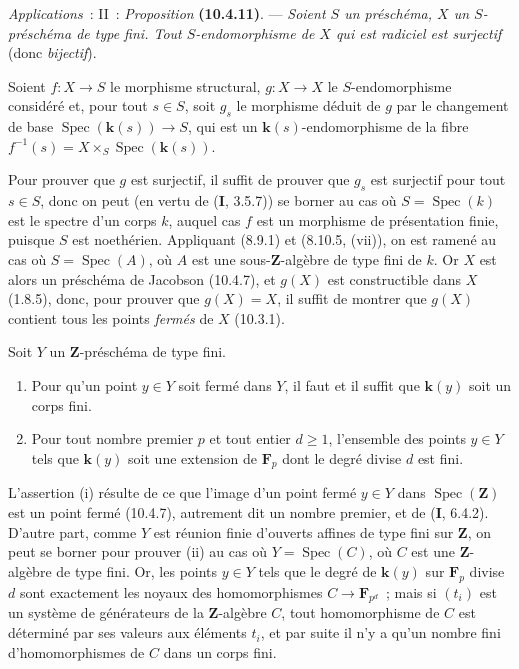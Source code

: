 \par\medskip\noindent{}%
\emph{Applications}~: II~: \emph{Proposition} \textbf{(10.4.11)}. --- \emph{Soient $S$ un
préschéma, $X$ un $S$-préschéma de type fini. Tout $S$-endomorphisme de $X$
qui est radiciel est surjectif} (donc \emph{bijectif}).
\par

Soient $f:X\to S$ le morphisme structural, $g:X\to X$ le $S$-endomorphisme
considéré et, pour tout $s\in S$, soit $g_s$ le morphisme déduit de $g$ par le
changement de base $\operatorname{Spec}(\boldsymbol{k}(s))\to S$, qui est un
$\boldsymbol{k}(s)$-endomorphisme de la fibre
$f^{-1}(s)=X\times_S\operatorname{Spec}(\boldsymbol{k}(s))$.

Pour prouver que $g$ est surjectif, il suffit de prouver que $g_s$ est
surjectif pour tout $s\in S$, donc on peut (en vertu de (\textbf{I}, 3.5.7))
se borner au cas où $S=\operatorname{Spec}(k)$ est le spectre d'un corps $k$,
auquel cas $f$ est un morphisme de présentation finie, puisque $S$ est
noethérien. Appliquant (8.9.1) et (8.10.5, (vii)), on est ramené au cas où
$S=\operatorname{Spec}(A)$, où $A$ est une sous-$\mathbf Z$-algèbre de type
fini de $k$. Or $X$ est alors un préschéma de Jacobson (10.4.7), et $g(X)$ est
constructible dans $X$ (1.8.5), donc, pour prouver que $g(X)=X$,
il suffit de montrer que $g(X)$ contient tous les points \emph{fermés} de $X$
(10.3.1).

\begin{lemma}[10.4.11.1]
\label{IV.10.4.11.1-fr}
Soit $Y$ un $\mathbf Z$-préschéma de type fini.
\begin{enumerate}[label=\textup{(\roman*)}]
  \item Pour qu'un point $y\in Y$ soit fermé dans $Y$, il faut et il suffit
  que $\boldsymbol{k}(y)$ soit un corps fini.
  \item Pour tout nombre premier $p$ et tout entier $d\geq1$, l'ensemble des
  points $y\in Y$ tels que $\boldsymbol{k}(y)$ soit une extension de $\mathbf F_p$ dont le
  degré divise $d$ est fini.
\end{enumerate}
\end{lemma}

L'assertion (i) résulte de ce que l'image d'un point fermé $y\in Y$ dans
$\operatorname{Spec}(\mathbf Z)$ est un point fermé (10.4.7), autrement dit
un nombre premier, et de (\textbf{I}, 6.4.2). D'autre part, comme $Y$ est
réunion finie d'ouverts affines de type fini sur $\mathbf Z$, on peut se
borner pour prouver (ii) au cas où $Y=\operatorname{Spec}(C)$, où $C$ est une
$\mathbf Z$-algèbre de type fini. Or, les points $y\in Y$ tels que le degré de
$\boldsymbol{k}(y)$ sur $\mathbf F_p$ divise $d$ sont exactement les noyaux des
homomorphismes $C\to\mathbf F_{p^d}$~; mais si $(t_i)$ est un système de
générateurs de la $\mathbf Z$-algèbre $C$, tout homomorphisme de $C$ est
déterminé par ses valeurs aux éléments $t_i$, et par suite il n'y a qu'un
nombre fini d'homomorphismes de $C$ dans un corps fini.

